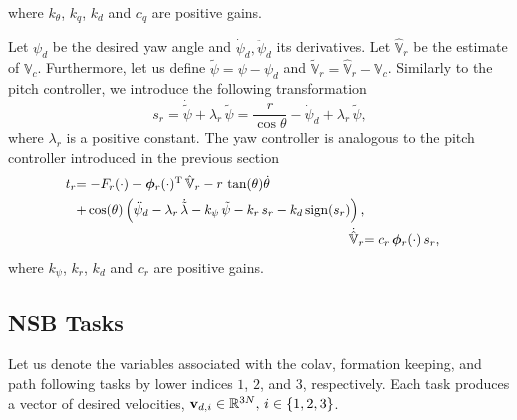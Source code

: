 \noindent where $k_{\theta}$, $k_q$, $k_d$ and $c_q$ are positive gains.

Let $\psi_d$ be the desired yaw angle and $\dot{\psi}_d, \ddot{\psi}_d$ its derivatives.
Let $\hat{\mathbb{V}}_r$ be the estimate of $\mathbb{V}_c$.
Furthermore, let us define $\tilde{\psi} = \psi - \psi_d$ and $\tilde{\mathbb{V}}_r = \hat{\mathbb{V}}_r - \mathbb{V}_c$.
Similarly to the pitch controller, we introduce the following transformation
\begin{equation}
    s_r = \dot{\tilde{\psi}} + \lambda_r\,\tilde{\psi} = \frac{r}{\cos\theta} - \dot{\psi}_d + \lambda_r\,\tilde{\psi},
\end{equation}
where $\lambda_r$ is a positive constant.
The yaw controller is analogous to the pitch controller introduced in the previous section
\begin{align}        
    \begin{split}
        \scale[0.95]{t_r} &\scale[0.95]{= - F_r(\cdot) - \bs{\phi}_r(\cdot)\T\,\hat{\mathbb{V}}_r - r\,\tan(\theta)\dot{\theta}} \\
        & \scale[0.95]{ + \cos(\theta)\left(\ddot{\psi}_d - \lambda_r\,\dot{\tilde{\lambda}} - k_{\psi}\,\tilde{\psi} - k_r\,s_r - k_d\,{\rm sign}(s_r)\right), }
    \end{split} \label{eq:nsb_5dof_t_r} \\
    \scale[0.95]{\dot{\hat{\mathbb{V}}}_r} & \scale[0.95]{= c_r\,\bs{\phi}_r(\cdot)\,s_r,} \label{eq:nsb_5dof_V_hat_r}
\end{align}
where $k_{\psi}$, $k_r$, $k_d$ and $c_r$ are positive gains.

\subsection{NSB Tasks}
\label{sec:nsb_5dof_NSB}
Let us denote the variables associated with the \gls{colav}, formation keeping, and path following tasks by lower indices $1$, $2$, and $3$, respectively.
Each task produces a vector of desired velocities, $\mathbf{v}_{d,i} \in \mathbb{R}^{3N},\, i\in\{1,2,3\}$.

